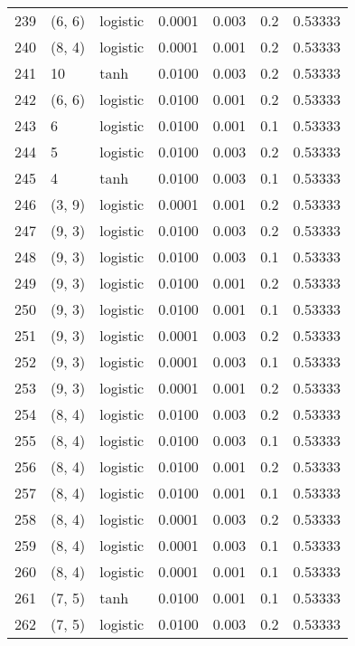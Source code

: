 \begin{tabular}{lllrrrr}
239 &      (6, 6) &  logistic &  0.0001 &  0.003 &  0.2 &   0.53333 \\
240 &      (8, 4) &  logistic &  0.0001 &  0.001 &  0.2 &   0.53333 \\
241 &          10 &      tanh &  0.0100 &  0.003 &  0.2 &   0.53333 \\
242 &      (6, 6) &  logistic &  0.0100 &  0.001 &  0.2 &   0.53333 \\
243 &           6 &  logistic &  0.0100 &  0.001 &  0.1 &   0.53333 \\
244 &           5 &  logistic &  0.0100 &  0.003 &  0.2 &   0.53333 \\
245 &           4 &      tanh &  0.0100 &  0.003 &  0.1 &   0.53333 \\
246 &      (3, 9) &  logistic &  0.0001 &  0.001 &  0.2 &   0.53333 \\
247 &      (9, 3) &  logistic &  0.0100 &  0.003 &  0.2 &   0.53333 \\
248 &      (9, 3) &  logistic &  0.0100 &  0.003 &  0.1 &   0.53333 \\
249 &      (9, 3) &  logistic &  0.0100 &  0.001 &  0.2 &   0.53333 \\
250 &      (9, 3) &  logistic &  0.0100 &  0.001 &  0.1 &   0.53333 \\
251 &      (9, 3) &  logistic &  0.0001 &  0.003 &  0.2 &   0.53333 \\
252 &      (9, 3) &  logistic &  0.0001 &  0.003 &  0.1 &   0.53333 \\
253 &      (9, 3) &  logistic &  0.0001 &  0.001 &  0.2 &   0.53333 \\
254 &      (8, 4) &  logistic &  0.0100 &  0.003 &  0.2 &   0.53333 \\
255 &      (8, 4) &  logistic &  0.0100 &  0.003 &  0.1 &   0.53333 \\
256 &      (8, 4) &  logistic &  0.0100 &  0.001 &  0.2 &   0.53333 \\
257 &      (8, 4) &  logistic &  0.0100 &  0.001 &  0.1 &   0.53333 \\
258 &      (8, 4) &  logistic &  0.0001 &  0.003 &  0.2 &   0.53333 \\
259 &      (8, 4) &  logistic &  0.0001 &  0.003 &  0.1 &   0.53333 \\
260 &      (8, 4) &  logistic &  0.0001 &  0.001 &  0.1 &   0.53333 \\
261 &      (7, 5) &      tanh &  0.0100 &  0.001 &  0.1 &   0.53333 \\
262 &      (7, 5) &  logistic &  0.0100 &  0.003 &  0.2 &   0.53333 \\

\end{tabular}
